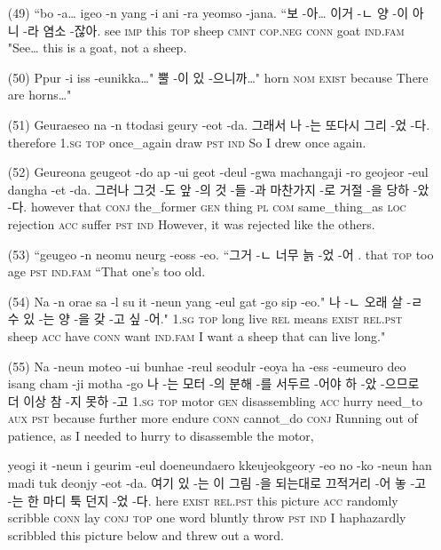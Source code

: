 \begin{itemize}
\item [(49)]
\tgl
		{``bo -a… igeo -n yang -i ani -ra yeomso -jana.}
		{``보 -아… 이거 -ㄴ 양 -이 아니 -라 염소 -잖아.}
		{see	\textsc{imp}	this	\textsc{top}	sheep	\textsc{cmnt}	\textsc{cop.neg}	\textsc{conn}	goat	\textsc{ind.fam}}
		{"See… this is a goat, not a sheep.}
		
\item [(50)]
\tgl
		{Ppur -i iss -eunikka…"}
		{뿔 -이 있 -으니까…"}
		{horn	\textsc{nom}	\textsc{exist}	because}
		{There are horns…"}
		
\item [(51)]
\tgl
		{Geuraeseo na -n ttodasi geury -eot -da.}
		{그래서 나 -는 또다시 그리 -었 -다.}
		{therefore	\textsc{1.sg}	\textsc{top}	once\_again	draw	\textsc{pst}	\textsc{ind}}
		{So I drew once again.}
		
\item [(52)]
\tgl
		{Geureona geugeot -do ap -ui geot -deul -gwa machangaji -ro geojeor -eul dangha -et -da.}
		{그러나 그것 -도 앞 -의 것 -들 -과 마찬가지 -로 거절 -을 당하 -았 -다.}
		{however	that	\textsc{conj}	the\_former	\textsc{gen}	thing	\textsc{pl}	\textsc{com}	same\_thing\_as	\textsc{loc}	rejection	\textsc{acc}	suffer	\textsc{pst}	\textsc{ind}}
		{However, it was rejected like the others.}

\item [(53)]
\tgl
		{``geugeo -n neomu neurg -eoss -eo.}
		{``그거 -ㄴ 너무 늙 -었 -어 .}
		{that	\textsc{top}	too	age	\textsc{pst}	\textsc{ind.fam}}
		{``That one's too old.}
		
\item [(54)]
\tgl
		{Na -n orae sa -l su it -neun yang -eul gat -go sip -eo."}
		{나 -ㄴ 오래 살 -ㄹ 수 있 -는 양 -을 갖 -고 싶 -어."}
		{\textsc{1.sg}	\textsc{top}	long	live	\textsc{rel}	means	\textsc{exist}	\textsc{rel.pst}	sheep	\textsc{acc}	have	\textsc{conn}	want	\textsc{ind.fam}}
		{I want a sheep that can live long."}

\item [(55)]
\tgl
		{Na -neun moteo -ui bunhae -reul seodulr -eoya ha -ess -eumeuro deo isang cham -ji motha -go}
		{나 -는 모터 -의 분해 -를 서두르 -어야 하 -았 -으므로 더 이상 참 -지 못하 -고}
		{\textsc{1.sg}	\textsc{top}	motor	\textsc{gen}	disassembling	\textsc{acc}	hurry	need\_to	\textsc{aux}	\textsc{pst}	because	further	more	endure	\textsc{conn}	cannot\_do	\textsc{conj}}
		{Running out of patience, as I needed to hurry to disassemble the motor,}

\tgl
		{yeogi it -neun i geurim -eul doeneundaero kkeujeokgeory -eo no -ko -neun han madi tuk deonjy -eot -da.}
		{여기 있 -는 이 그림 -을 되는대로 끄적거리 -어 놓 -고 -는 한 마디 툭 던지 -었 -다.}
		{here	\textsc{exist}	\textsc{rel.pst}	this	picture	\textsc{acc}	randomly	scribble	\textsc{conn}	lay	\textsc{conj}	\textsc{top}	one	word	bluntly	throw	\textsc{pst}	\textsc{ind}}
		{I haphazardly scribbled this picture below and threw out a word.}
		

\end{itemize}
